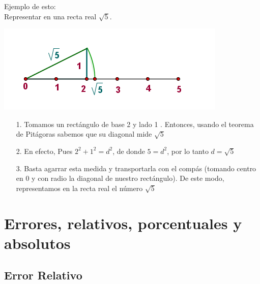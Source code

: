 \documentclass{article}
\begin{document}
	Ejemplo de esto: \\
	Representar en una recta real $\sqrt{5}$.
	
\begin{center}
	\includegraphics{screenshot001}
\end{center}
	
	
	\begin{itemize}
		\item[1. ]  Tomamos un rectángulo de base 2  y lado 1 . Entonces, usando el teorema de Pitágoras sabemos que su diagonal mide $\sqrt{5}$
		
		\item[2. ] En efecto, Pues $2^2 + 1^2 = d^2$, de donde $5=d^2$, por lo tanto $d=\sqrt{5}$
		
		\item[3. ]Basta agarrar esta medida y transportarla con el compás (tomando centro en 0 y con radio la diagonal de nuestro rectángulo). De este modo, representamos en la recta real el número $\sqrt{5}$
	\end{itemize}
	
	
	 \begin{center}
	 \end{center}
	 
	 
	 
	\section{Errores, relativos, porcentuales y absolutos}
	\subsection{Error Relativo}
	
\end{document}
